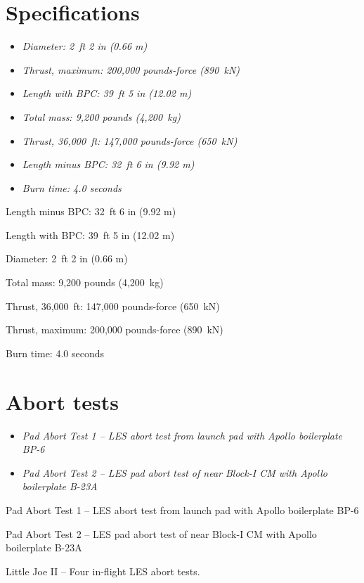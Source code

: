 \section{Specifications}\label{specifications-1}

\begin{itemize}
\item
  \emph{Diameter: 2~ft 2 in (0.66 m)}
\item
  \emph{Thrust, maximum: 200,000 pounds-force (890~kN)}
\item
  \emph{Length with BPC: 39~ft 5 in (12.02 m)}
\item
  \emph{Total mass: 9,200 pounds (4,200~kg)}
\item
  \emph{Thrust, 36,000~ft: 147,000 pounds-force (650~kN)}
\item
  \emph{Length minus BPC: 32~ft 6 in (9.92 m)}
\item
  \emph{Burn time: 4.0 seconds}
\end{itemize}

Length minus BPC: 32~ft 6 in (9.92 m)

Length with BPC: 39~ft 5 in (12.02 m)

Diameter: 2~ft 2 in (0.66 m)

Total mass: 9,200 pounds (4,200~kg)

Thrust, 36,000~ft: 147,000 pounds-force (650~kN)

Thrust, maximum: 200,000 pounds-force (890~kN)

Burn time: 4.0 seconds

\section{Abort tests}\label{abort-tests}

\begin{itemize}
\item
  \emph{Pad Abort Test 1 -- LES abort test from launch pad with Apollo
  boilerplate BP-6}
\item
  \emph{Pad Abort Test 2 -- LES pad abort test of near Block-I CM with
  Apollo boilerplate B-23A}
\end{itemize}

Pad Abort Test 1 -- LES abort test from launch pad with Apollo
boilerplate BP-6

Pad Abort Test 2 -- LES pad abort test of near Block-I CM with Apollo
boilerplate B-23A

Little Joe II -- Four in-flight LES abort tests.

